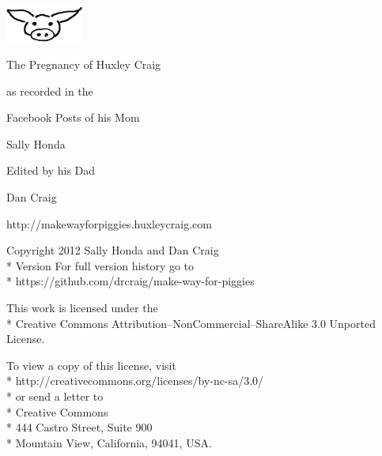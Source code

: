 \documentclass[11pt,ebook]{memoir}
\begin{document}
\frontmatter

\thispagestyle{empty}
\vspace*{1in}
\begin{center}
\end{center}

\cleardoublepage
\thispagestyle{empty}
\vspace*{\fill}
\begin{center}
\par
\vspace{0.15in}
\includegraphics[width=1in]{static_files/wiggins-150x71.png}\par
\vspace{0.15in}
\LARGE{The Pregnancy of Huxley Craig}\par
\vspace{0.1in}
\large{as recorded in the}\par
\large{Facebook Posts of his Mom}\par
\LARGE{Sally Honda}\par
\vspace{1in}
\large{Edited by his Dad}\par
\LARGE{Dan Craig}\par
\vspace{0.2in}
\large{http://makewayforpiggies.huxleycraig.com}
\end{center}
\clearpage

\begingroup
\vspace*{\fill}
\footnotesize
\setlength{\parindent}{0pt}
\setlength{\parskip}{\baselineskip}
\textcopyright{} Copyright 2012 Sally Honda and Dan Craig\\*
Version %
For full version history go to\\*
https://github.com/drcraig/make-way-for-piggies

This work is licensed under the\\*
Creative Commons Attribution--NonCommercial--ShareAlike 3.0 Unported License.

To view a copy of this license, visit \\*
http://creativecommons.org/licenses/by-nc-sa/3.0/\\*
or send a letter to \\*
Creative Commons\\*
444 Castro Street, Suite 900\\*
Mountain View, California, 94041, USA.
\vspace*{\fill}
\endgroup
\clearpage
\end{document}
